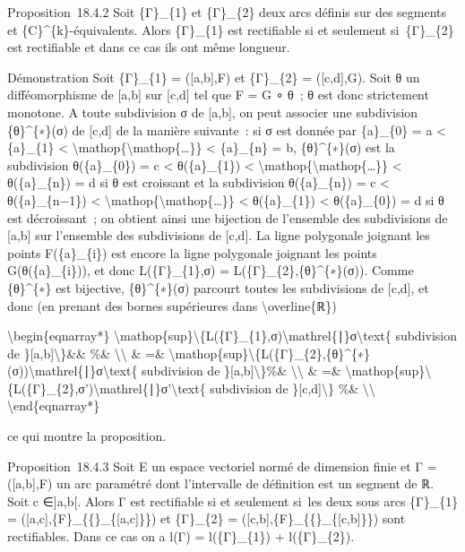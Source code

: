 \documentclass[]{article}
\begin{document}
Proposition~18.4.2 Soit \{Γ\}\_\{1\} et \{Γ\}\_\{2\} deux arcs définis
sur des segments et \{C\}\^{}\{k\}-équivalents. Alors \{Γ\}\_\{1\} est
rectifiable si et seulement si~\{Γ\}\_\{2\} est rectifiable et dans ce
cas ils ont même longueur.

Démonstration Soit \{Γ\}\_\{1\} = ({[}a,b{]},F) et \{Γ\}\_\{2\} =
({[}c,d{]},G). Soit θ un difféomorphisme de {[}a,b{]} sur {[}c,d{]} tel
que F = G ∘ θ~; θ est donc strictement monotone. A toute subdivision σ
de {[}a,b{]}, on peut associer une subdivision \{θ\}\^{}\{∗\}(σ) de
{[}c,d{]} de la manière suivante~: si σ est donnée par \{a\}\_\{0\} = a
\textless{} \{a\}\_\{1\} \textless{}
\textbackslash{}mathop\{\textbackslash{}mathop\{\ldots{}\}\} \textless{}
\{a\}\_\{n\} = b, \{θ\}\^{}\{∗\}(σ) est la subdivision θ(\{a\}\_\{0\}) =
c \textless{} θ(\{a\}\_\{1\}) \textless{}
\textbackslash{}mathop\{\textbackslash{}mathop\{\ldots{}\}\} \textless{}
θ(\{a\}\_\{n\}) = d si θ est croissant et la subdivision θ(\{a\}\_\{n\})
= c \textless{} θ(\{a\}\_\{n−1\}) \textless{}
\textbackslash{}mathop\{\textbackslash{}mathop\{\ldots{}\}\} \textless{}
θ(\{a\}\_\{1\}) \textless{} θ(\{a\}\_\{0\}) = d si θ est décroissant~;
on obtient ainsi une bijection de l'ensemble des subdivisions de
{[}a,b{]} sur l'ensemble des subdivisions de {[}c,d{]}. La ligne
polygonale joignant les points F(\{a\}\_\{i\}) est encore la ligne
polygonale joignant les points G(θ(\{a\}\_\{i\})), et donc
L(\{Γ\}\_\{1\},σ) = L(\{Γ\}\_\{2\},\{θ\}\^{}\{∗\}(σ)). Comme
\{θ\}\^{}\{∗\} est bijective, \{θ\}\^{}\{∗\}(σ) parcourt toutes les
subdivisions de {[}c,d{]}, et donc (en prenant des bornes supérieures
dans \textbackslash{}overline\{ℝ\})

\textbackslash{}begin\{eqnarray*\}
\textbackslash{}mathop\{sup\}\textbackslash{}\{L(\{Γ\}\_\{1\},σ)\textbackslash{}mathrel\{∣\}σ\textbackslash{}text\{
subdivision de \}{[}a,b{]}\textbackslash{}\}\&\& \%\&
\textbackslash{}\textbackslash{} \& =\&
\textbackslash{}mathop\{sup\}\textbackslash{}\{L(\{Γ\}\_\{2\},\{θ\}\^{}\{∗\}(σ))\textbackslash{}mathrel\{∣\}σ\textbackslash{}text\{
subdivision de \}{[}a,b{]}\textbackslash{}\}\%\&
\textbackslash{}\textbackslash{} \& =\&
\textbackslash{}mathop\{sup\}\textbackslash{}\{L(\{Γ\}\_\{2\},σ')\textbackslash{}mathrel\{∣\}σ'\textbackslash{}text\{
subdivision de \}{[}c,d{]}\textbackslash{}\} \%\&
\textbackslash{}\textbackslash{} \textbackslash{}end\{eqnarray*\}

ce qui montre la proposition.

Proposition~18.4.3 Soit E un espace vectoriel normé de dimension finie
et Γ = ({[}a,b{]},F) un arc paramétré dont l'intervalle de définition
est un segment de ℝ. Soit c ∈{]}a,b{[}. Alors Γ est rectifiable si et
seulement si~les deux sous arcs \{Γ\}\_\{1\} =
({[}a,c{]},\{F\}\_\{\{\textbar{}\}\_\{{[}a,c{]}\}\}) et \{Γ\}\_\{2\} =
({[}c,b{]},\{F\}\_\{\{\textbar{}\}\_\{{[}c,b{]}\}\}) sont rectifiables.
Dans ce cas on a l(Γ) = l(\{Γ\}\_\{1\}) + l(\{Γ\}\_\{2\}).
\end{document}
